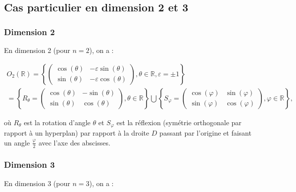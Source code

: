 \documentclass[french]{book}
\theoremstyle{definition}
\begin{document}
\subsection{Cas particulier en dimension 2 et 3}

\subsubsection{Dimension 2}


En dimension 2 (pour \(n=2\)), on a :

  \begin{gather*}
    O_2(\mathbb{R}) = \left\{  \begin{pmatrix}
    \cos(\theta) & - \varepsilon\sin(\theta) \\
    \sin(\theta) & - \varepsilon\cos(\theta)
  \end{pmatrix}, \theta \in \mathbb{R}, \varepsilon = \pm 1 \right\} \\
  = \left\{ R _{\theta} = \begin{pmatrix}
  \cos(\theta) & - \sin(\theta) \\
  \sin(\theta) & \cos(\theta)
\end{pmatrix}, \theta \in \mathbb{R} \right\} \bigcup \left\{ S _{\varphi} = \begin{pmatrix}
\cos(\varphi) & \sin(\varphi) \\
\sin(\varphi) & \cos(\varphi)
\end{pmatrix}, \varphi \in \mathbb{R} \right\},
  \end{gather*}

  où \(R _{\theta}\) est la rotation d'angle \(\theta\) et \(S _{\varphi}\) est la réflexion (symétrie orthogonale par rapport à un hyperplan) par rapport à la droite \(D\) passant par l'origine et faisant un angle \(\displaystyle\frac{\varphi}{2}\) avec l'axe des abscisses.

\subsubsection{Dimension 3}

En dimension 3 (pour \(n=3\)), on a :
\end{document}
